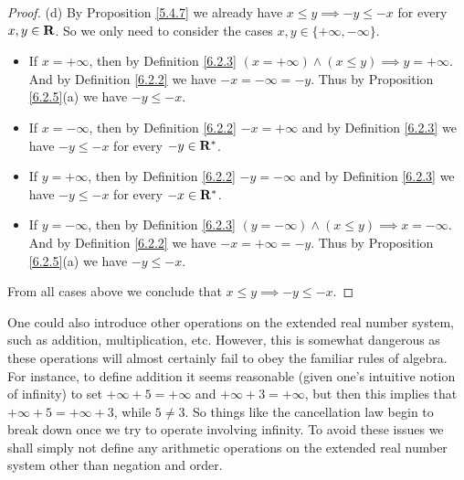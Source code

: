 \begin{proof}{(d)}
    By Proposition \ref{5.4.7} we already have \(x \leq y \implies -y \leq -x\) for every \(x, y \in \mathbf{R}\).
    So we only need to consider the cases \(x, y \in \{+\infty, -\infty\}\).
    \begin{itemize}
        \item If \(x = +\infty\), then by Definition \ref{6.2.3} \((x = +\infty) \land (x \leq y) \implies y = +\infty\).
              And by Definition \ref{6.2.2} we have \(-x = -\infty = -y\).
              Thus by Proposition \ref{6.2.5}(a) we have \(-y \leq -x\).
        \item If \(x = -\infty\), then by Definition \ref{6.2.2} \(-x = +\infty\) and by Definition \ref{6.2.3} we have \(-y \leq -x\) for every \(-y \in \mathbf{R}^*\).
        \item If \(y = +\infty\), then by Definition \ref{6.2.2} \(-y = -\infty\) and by Definition \ref{6.2.3} we have \(-y \leq -x\) for every \(-x \in \mathbf{R}^*\).
        \item If \(y = -\infty\), then by Definition \ref{6.2.3} \((y = -\infty) \land (x \leq y) \implies x = -\infty\).
              And by Definition \ref{6.2.2} we have \(-x = +\infty = -y\).
              Thus by Proposition \ref{6.2.5}(a) we have \(-y \leq -x\).
    \end{itemize}
    From all cases above we conclude that \(x \leq y \implies -y \leq -x\).
\end{proof}

\begin{note}
    One could also introduce other operations on the extended real number system, such as addition, multiplication, etc.
    However, this is somewhat dangerous as these operations will almost certainly fail to obey the familiar rules of algebra.
    For instance, to define addition it seems reasonable (given one's intuitive notion of infinity) to set \(+\infty + 5 = +\infty\) and \(+\infty + 3 = +\infty\), but then this implies that \(+\infty + 5 = +\infty + 3\), while \(5 \neq 3\).
    So things like the cancellation law begin to break down once we try to operate involving infinity.
    To avoid these issues we shall simply not define any arithmetic operations on the extended real number system other than negation and order.
\end{note}

